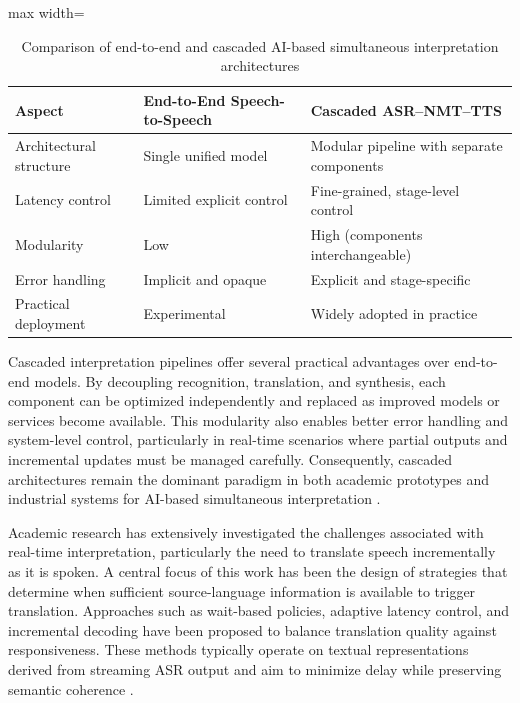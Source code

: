 \begin{table}[!htbp]
  \centering
  \caption[AI-based interpretation architectures]{Comparison of end-to-end and cascaded AI-based simultaneous interpretation architectures}
  \label{tab:ai_interpretation_architectures}
  \begin{adjustbox}{max width=\textwidth}
    \begin{tabular}{p{4cm} p{6.5cm} p{6.5cm}}
      \toprule
      \textbf{Aspect} & \textbf{End-to-End Speech-to-Speech} & \textbf{Cascaded ASR--NMT--TTS} \\
      \midrule
      Architectural structure &
      Single unified model &
      Modular pipeline with separate components \\
      \midrule
      Latency control &
      Limited explicit control &
      Fine-grained, stage-level control \\
      \midrule
      Modularity &
      Low &
      High (components interchangeable) \\
      \midrule
      Error handling &
      Implicit and opaque &
      Explicit and stage-specific \\
      \midrule
      Practical deployment &
      Experimental &
      Widely adopted in practice \\
      \bottomrule
    \end{tabular}
  \end{adjustbox}
\end{table}

Cascaded interpretation pipelines offer several practical advantages over end-to-end models. By decoupling recognition, translation, and synthesis, each component can be optimized independently and replaced as improved models or services become available. This modularity also enables better error handling and system-level control, particularly in real-time scenarios where partial outputs and incremental updates must be managed carefully. Consequently, cascaded architectures remain the dominant paradigm in both academic prototypes and industrial systems for AI-based simultaneous interpretation \cite{popescu-belis2025s2streview}.

Academic research has extensively investigated the challenges associated with real-time interpretation, particularly the need to translate speech incrementally as it is spoken. A central focus of this work has been the design of strategies that determine when sufficient source-language information is available to trigger translation. Approaches such as wait-based policies, adaptive latency control, and incremental decoding have been proposed to balance translation quality against responsiveness. These methods typically operate on textual representations derived from streaming ASR output and aim to minimize delay while preserving semantic coherence \cite{ma2019staclarxiv, niehues2018simultaneousarxiv}.

